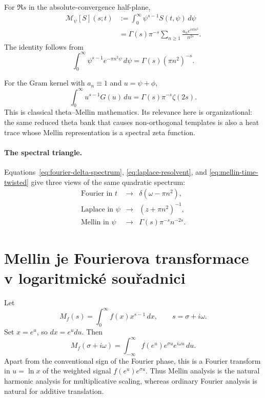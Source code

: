 For $\Re s$ in the absolute-convergence half-plane,
\begin{align}
  \mathcal M_\psi[S](s;t)
  &:=\int_0^\infty \psi^{s-1}S(t,\psi)\,d\psi \\
  &=\Gamma(s)\pi^{-s}
    \sum_{n\ge1}\frac{a_n e^{i\pi t n^2}}{n^{2s}}.
  \label{eq:mellin-time-twisted}
\end{align}
The identity follows from
\begin{equation}
 \int_0^\infty \psi^{s-1}e^{-\pi n^2\psi}\,d\psi
 =\Gamma(s)(\pi n^2)^{-s}.
\end{equation}

For the Gram kernel with $a_n\equiv1$ and $u=\psi+\phi$,
\begin{equation}
 \int_0^\infty u^{s-1}G(u)\,du
 =\Gamma(s)\pi^{-s}\zeta(2s).
 \label{eq:gram-mellin-zeta}
\end{equation}
This is classical theta--Mellin mathematics.  Its relevance here is organizational:
the same reduced theta bank that causes non-orthogonal templates is also a heat trace
whose Mellin representation is a spectral zeta function.

\paragraph{The spectral triangle.}
Equations~\eqref{eq:fourier-delta-spectrum}, \eqref{eq:laplace-resolvent}, and
\eqref{eq:mellin-time-twisted} give three views of the same quadratic spectrum:
\begin{equation}
 \boxed{
 \begin{array}{ccl}
   \text{Fourier in }t   &\longrightarrow& \delta(\omega-\pi n^2),\\[2mm]
   \text{Laplace in }\psi&\longrightarrow& (z+\pi n^2)^{-1},\\[2mm]
   \text{Mellin in }\psi &\longrightarrow& \Gamma(s)\pi^{-s}n^{-2s}.
 \end{array}}
 \label{eq:spectral-triangle}
\end{equation}

\section{Mellin je Fourierova transformace v logaritmické souřadnici}

Let
\begin{equation}
  M_f(s)=\int_0^\infty f(x)x^{s-1}\,dx,
  \qquad s=\sigma+i\omega.
\end{equation}
Set $x=e^u$, so $dx=e^u du$.  Then
\begin{equation}
  M_f(\sigma+i\omega)
  =\int_{-\infty}^{\infty}
   f(e^u)e^{\sigma u}e^{i\omega u}\,du.
  \label{eq:mellin-log-fourier}
\end{equation}
Apart from the conventional sign of the Fourier phase, this is a Fourier transform in
$u=\ln x$ of the weighted signal $f(e^u)e^{\sigma u}$.  Thus Mellin analysis is the
natural harmonic analysis for multiplicative scaling, whereas ordinary Fourier analysis
is natural for additive translation.

